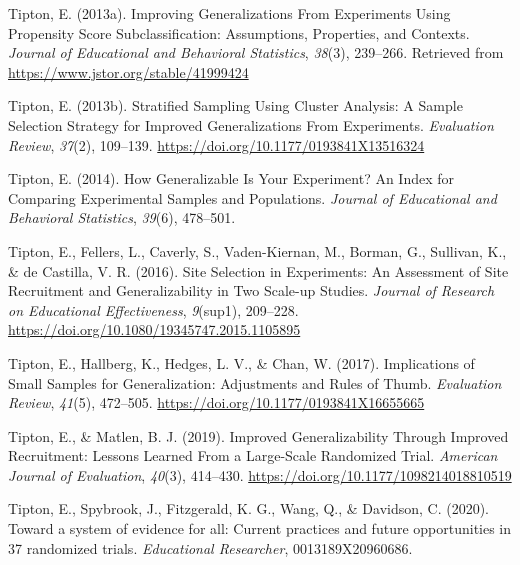 \documentclass[
  english,
  man,floatsintext]{apa6}
\begin{document}
\leavevmode\hypertarget{ref-tiptonImprovingGeneralizationsExperiments2013}{}%
Tipton, E. (2013a). Improving Generalizations From Experiments Using Propensity Score Subclassification: Assumptions, Properties, and Contexts. \emph{Journal of Educational and Behavioral Statistics}, \emph{38}(3), 239--266. Retrieved from \url{https://www.jstor.org/stable/41999424}

\leavevmode\hypertarget{ref-tiptonStratifiedSamplingUsing2013}{}%
Tipton, E. (2013b). Stratified Sampling Using Cluster Analysis: A Sample Selection Strategy for Improved Generalizations From Experiments. \emph{Evaluation Review}, \emph{37}(2), 109--139. \url{https://doi.org/10.1177/0193841X13516324}

\leavevmode\hypertarget{ref-tiptonHowGeneralizableYour2014}{}%
Tipton, E. (2014). How Generalizable Is Your Experiment? An Index for Comparing Experimental Samples and Populations. \emph{Journal of Educational and Behavioral Statistics}, \emph{39}(6), 478--501.

\leavevmode\hypertarget{ref-tiptonSiteSelectionExperiments2016}{}%
Tipton, E., Fellers, L., Caverly, S., Vaden-Kiernan, M., Borman, G., Sullivan, K., \& de Castilla, V. R. (2016). Site Selection in Experiments: An Assessment of Site Recruitment and Generalizability in Two Scale-up Studies. \emph{Journal of Research on Educational Effectiveness}, \emph{9}(sup1), 209--228. \url{https://doi.org/10.1080/19345747.2015.1105895}

\leavevmode\hypertarget{ref-tiptonImplicationsSmallSamples2017}{}%
Tipton, E., Hallberg, K., Hedges, L. V., \& Chan, W. (2017). Implications of Small Samples for Generalization: Adjustments and Rules of Thumb. \emph{Evaluation Review}, \emph{41}(5), 472--505. \url{https://doi.org/10.1177/0193841X16655665}

\leavevmode\hypertarget{ref-tiptonImprovedGeneralizabilityImproved2019}{}%
Tipton, E., \& Matlen, B. J. (2019). Improved Generalizability Through Improved Recruitment: Lessons Learned From a Large-Scale Randomized Trial. \emph{American Journal of Evaluation}, \emph{40}(3), 414--430. \url{https://doi.org/10.1177/1098214018810519}

\leavevmode\hypertarget{ref-tipton2020toward}{}%
Tipton, E., Spybrook, J., Fitzgerald, K. G., Wang, Q., \& Davidson, C. (2020). Toward a system of evidence for all: Current practices and future opportunities in 37 randomized trials. \emph{Educational Researcher}, 0013189X20960686.

\endgroup
\end{document}
